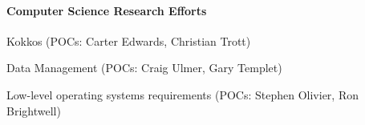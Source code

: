 \paragraph{Computer Science Research Efforts}
\begin{compactitem}
\item Kokkos (POCs: Carter Edwards, Christian Trott)
\item Data Management (POCs: Craig Ulmer, Gary Templet)
\item Low-level operating systems requirements (POCs: Stephen Olivier, Ron
    Brightwell)
\end{compactitem}



